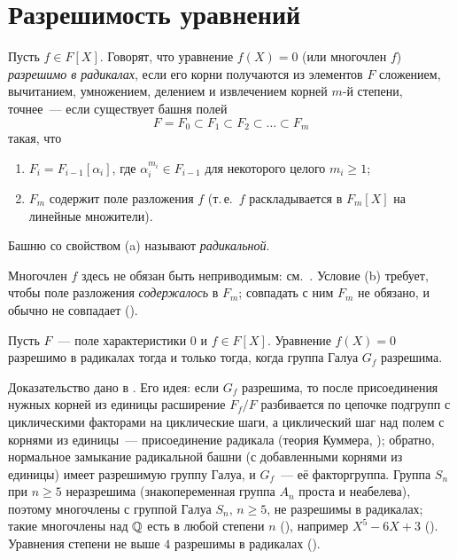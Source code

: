 \makeatletter
{}
\makeatother
\section{Разрешимость уравнений}

\begin{definition}[3.27i]
Пусть $f\in F[X]$. Говорят, что уравнение $f(X)=0$ (или многочлен $f$) \emph{разрешимо в радикалах}, если его корни
получаются из элементов $F$ сложением, вычитанием, умножением, делением и извлечением корней $m$-й степени, точнее~---
если существует башня полей
\[
F=F_0\subset F_1\subset F_2\subset\dots\subset F_m
\]
такая, что
\begin{enumerate}[label=(\alph*)]
\item $F_i=F_{i-1}[\alpha_i]$, где $\alpha_i^{m_i}\in F_{i-1}$ для некоторого целого $m_i\ge1$;
\item $F_m$ содержит поле разложения $f$ (т.\,е.\ $f$ раскладывается в $F_m[X]$ на линейные множители).
\end{enumerate}
Башню со свойством (a) называют \emph{радикальной}.
\end{definition}

Многочлен $f$ здесь не обязан быть неприводимым: см.\ . Условие (b) требует, чтобы поле разложения
\emph{содержалось} в $F_m$; совпадать с ним $F_m$ не обязано, и обычно не совпадает ().

\begin{theorem}[3.28: Галуа, 1832]
Пусть $F$~--- поле характеристики $0$ и $f\in F[X]$. Уравнение $f(X)=0$ разрешимо в радикалах тогда и только тогда,
когда группа Галуа $G_f$ разрешима.
\end{theorem}

Доказательство дано в . Его идея: если $G_f$ разрешима, то после присоединения нужных корней из единицы
расширение $F_f/F$ разбивается по цепочке подгрупп с циклическими факторами на циклические шаги, а циклический шаг над
полем с корнями из единицы~--- присоединение радикала (теория Куммера, ); обратно, нормальное замыкание
радикальной башни (с добавленными корнями из единицы) имеет разрешимую группу Галуа, и $G_f$~--- её факторгруппа.
Группа $S_n$ при $n\ge5$ неразрешима (знакопеременная группа $A_n$ проста и неабелева), поэтому многочлены с группой
Галуа $S_n$, $n\ge5$, не разрешимы в радикалах; такие многочлены над $\mathbb Q$ есть в любой степени $n$ (), например
$X^5-6X+3$ (). Уравнения степени не выше $4$ разрешимы в радикалах ().

